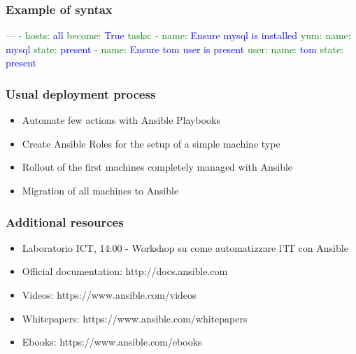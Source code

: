 \documentclass[t,aspectratio=169]{beamer}
\begin{document}
\begin{frame}[fragile]
    \frametitle{Example of syntax}
    \begin{semiverbatim}
\textcolor{green}{---}
\textcolor{green}{- hosts:} \textcolor{blue}{all}
\textcolor{green}{  become:} \textcolor{blue}{True}
\textcolor{green}{  tasks:}
\textcolor{green}{  - name:} \textcolor{blue}{Ensure mysql is installed}
\textcolor{green}{    yum:}
\textcolor{green}{      name:} \textcolor{blue}{mysql}
\textcolor{green}{      state:} \textcolor{blue}{present}
\textcolor{green}{  - name:} \textcolor{blue}{Ensure tom user is present}
\textcolor{green}{    user:}
\textcolor{green}{      name:} \textcolor{blue}{tom}
\textcolor{green}{      state:} \textcolor{blue}{present}
    \end{semiverbatim}
\end{frame}

\begin{frame}
    \frametitle{Usual deployment process}
    \begin{itemize}
        \item<2-> Automate few actions with Ansible Playbooks
        \item<3-> Create Ansible Roles for the setup of a simple machine type
        \item<4-> Rollout of the first machines completely managed with Ansible
        \item<5-> Migration of all machines to Ansible
    \end{itemize}
\end{frame}

\begin{frame}
    \frametitle{Additional resources}
    \begin{itemize}
        \item Laboratorio ICT, 14:00 - Workshop su come automatizzare l'IT con Ansible
        \item Official documentation: http://docs.ansible.com
        \item Videos: https://www.ansible.com/videos
        \item Whitepapers: https://www.ansible.com/whitepapers
        \item Ebooks: https://www.ansible.com/ebooks
    \end{itemize}
\end{frame}

\end{document}

